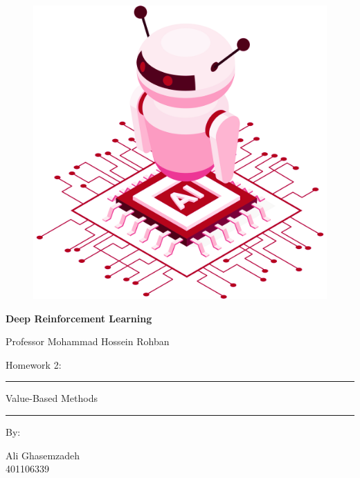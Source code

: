 \documentclass[12pt]{article}
\begin{document}
	
	\thispagestyle{plain}
	
	\begin{center}
		
		\vspace*{-1.5cm}
		\begin{figure}[!h]
			\centering
			\includegraphics[width=0.7\linewidth]{figs/cover-std.png}
		\end{figure}
		
		{
			
			{\color{DarkBlue} {\fontsize{30}{50} \textbf{
						Deep Reinforcement Learning
			}}}
			
			{\color{DarkBlue} {\Large
					Professor Mohammad Hossein Rohban
			}}
		}
		
		
		\vspace{20pt}
		
		{
			
			
			{\color{RedOrange}
				{\Large
					Homework 2:
				}\\
			}
			{\color{BrickRed}
				\rule{12cm}{0.5pt}
				
				{\Huge
					Value-Based Methods
				}
				\rule{12cm}{0.5pt}
			}
			
			\vspace{10pt}
			
			{\color{RoyalPurple} { \small By:} } \\
			\vspace{10pt}
			
			{\color{Blue} { \LARGE Ali Ghasemzadeh } } \\
			\vspace{5pt}
			{\color{RoyalBlue} { \Large 401106339 } }
			
}
\end{center}
\end{document}
